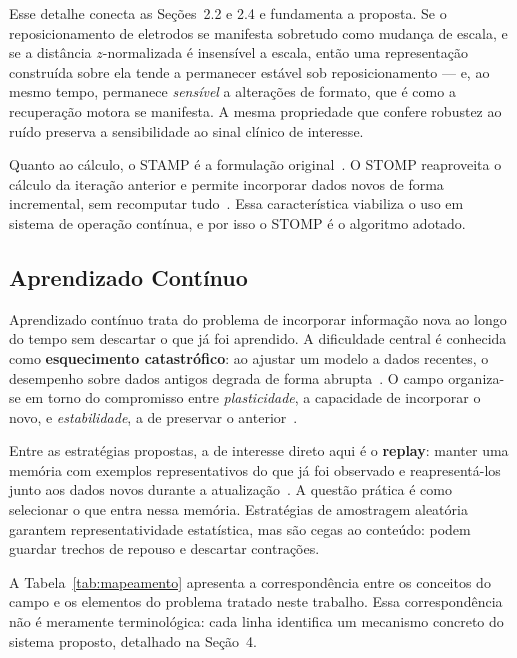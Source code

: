 Esse detalhe conecta as Seções~2.2 e 2.4 e fundamenta a proposta. Se o
reposicionamento de eletrodos se manifesta sobretudo como mudança de
escala, e se a distância $z$-normalizada é insensível a escala, então
uma representação construída sobre ela tende a permanecer estável sob
reposicionamento --- e, ao mesmo tempo, permanece \textit{sensível} a
alterações de formato, que é como a recuperação motora se manifesta. A
mesma propriedade que confere robustez ao ruído preserva a
sensibilidade ao sinal clínico de interesse.

Quanto ao cálculo, o STAMP é a formulação
original~\cite{ref:matrix_profile_base}. O STOMP reaproveita o cálculo
da iteração anterior e permite incorporar dados novos de forma
incremental, sem recomputar
tudo~\cite{ref:matrix_profile_stomp}. Essa característica viabiliza o
uso em sistema de operação contínua, e por isso o STOMP é o algoritmo
adotado.

\subsection{Aprendizado Contínuo}

Aprendizado contínuo trata do problema de incorporar informação nova ao
longo do tempo sem descartar o que já foi aprendido. A dificuldade
central é conhecida como \textbf{esquecimento catastrófico}: ao ajustar
um modelo a dados recentes, o desempenho sobre dados antigos degrada de
forma abrupta~\cite{ref:esquecimento_catastrofico}. O campo organiza-se
em torno do compromisso entre \textit{plasticidade}, a capacidade de
incorporar o novo, e \textit{estabilidade}, a de preservar o
anterior~\cite{ref:aprendizado_continuo}.

Entre as estratégias propostas, a de interesse direto aqui é o
\textbf{replay}: manter uma memória com exemplos representativos do que
já foi observado e reapresentá-los junto aos dados novos durante a
atualização~\cite{ref:replay_memoria}. A questão prática é como
selecionar o que entra nessa memória. Estratégias de amostragem
aleatória garantem representatividade estatística, mas são cegas ao
conteúdo: podem guardar trechos de repouso e descartar contrações.

A Tabela~\ref{tab:mapeamento} apresenta a correspondência entre os
conceitos do campo e os elementos do problema tratado neste trabalho.
Essa correspondência não é meramente terminológica: cada linha
identifica um mecanismo concreto do sistema proposto, detalhado na
Seção~4.

